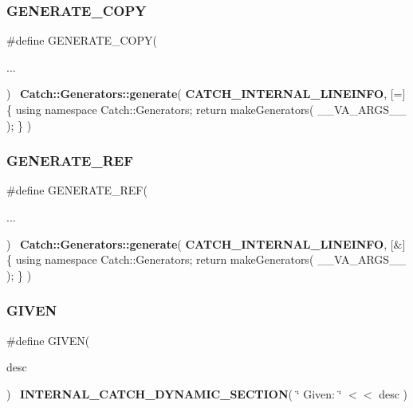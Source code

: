 \mbox{\label{catch_8hpp_a44e2fff00253a218f0a392ad6abac624}} 
\subsubsection{GENERATE\_COPY}
{\footnotesize\ttfamily \#define G\+E\+N\+E\+R\+A\+T\+E\+\_\+\+C\+O\+PY(\begin{DoxyParamCaption}\item[{}]{... }\end{DoxyParamCaption})~\textbf{ Catch\+::\+Generators\+::generate}( \textbf{ C\+A\+T\+C\+H\+\_\+\+I\+N\+T\+E\+R\+N\+A\+L\+\_\+\+L\+I\+N\+E\+I\+N\+FO}, [=]\{ using namespace Catch\+::\+Generators; return make\+Generators( \+\_\+\+\_\+\+V\+A\+\_\+\+A\+R\+G\+S\+\_\+\+\_\+ ); \} )}

\mbox{\label{catch_8hpp_aebcb76dcf5cbbbd3dca153a21d6f78fe}} 
\subsubsection{GENERATE\_REF}
{\footnotesize\ttfamily \#define G\+E\+N\+E\+R\+A\+T\+E\+\_\+\+R\+EF(\begin{DoxyParamCaption}\item[{}]{... }\end{DoxyParamCaption})~\textbf{ Catch\+::\+Generators\+::generate}( \textbf{ C\+A\+T\+C\+H\+\_\+\+I\+N\+T\+E\+R\+N\+A\+L\+\_\+\+L\+I\+N\+E\+I\+N\+FO}, [\&]\{ using namespace Catch\+::\+Generators; return make\+Generators( \+\_\+\+\_\+\+V\+A\+\_\+\+A\+R\+G\+S\+\_\+\+\_\+ ); \} )}

\mbox{\label{catch_8hpp_a2b70c603786d759242856d883dbe93bd}} 
\subsubsection{GIVEN}
{\footnotesize\ttfamily \#define G\+I\+V\+EN(\begin{DoxyParamCaption}\item[{}]{desc }\end{DoxyParamCaption})~\textbf{ I\+N\+T\+E\+R\+N\+A\+L\+\_\+\+C\+A\+T\+C\+H\+\_\+\+D\+Y\+N\+A\+M\+I\+C\+\_\+\+S\+E\+C\+T\+I\+ON}( \char`\"{}    Given\+: \char`\"{} $<$$<$ desc )}

